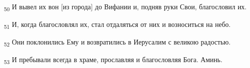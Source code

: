\begin{tcolorbox}
\textsubscript{50} И вывел их вон [из города] до Вифании и, подняв руки Свои, благословил их.
\end{tcolorbox}
\begin{tcolorbox}
\textsubscript{51} И, когда благословлял их, стал отдаляться от них и возноситься на небо.
\end{tcolorbox}
\begin{tcolorbox}
\textsubscript{52} Они поклонились Ему и возвратились в Иерусалим с великою радостью.
\end{tcolorbox}
\begin{tcolorbox}
\textsubscript{53} И пребывали всегда в храме, прославляя и благословляя Бога. Аминь.
\end{tcolorbox}
